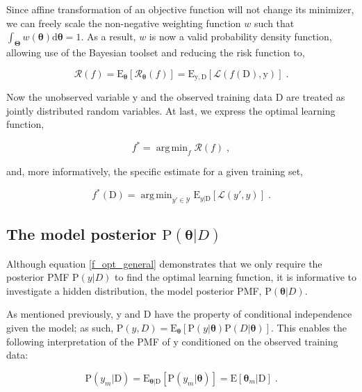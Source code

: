 \documentclass[12pt]{article}
\DeclareMathOperator*{\argmin}{arg\,min}
\begin{document}
Since affine transformation of an objective function will not change its minimizer, we can freely scale the non-negative weighting function $w$ such that $\int_{\bm{\Theta}} w(\bm{\theta}) \mathrm{d}\bm{\theta} = 1$. As a result, $w$ is now a valid probability density function, allowing use of the Bayesian toolset and reducing the risk function to,   

\begin{equation}
\mathcal{R}(f) = \text{E}_{\bm{\theta}}\left[  \mathcal{R}_{\bm{\theta}}(f) \right] = \text{E}_{\mathrm{y},\mathrm{D}}\left[ \mathcal{L}(f(\mathrm{D}),\mathrm{y}) \right] \;.
\end{equation}

Now the unobserved variable $\mathrm{y}$ and the observed training data $\mathrm{D}$ are treated as jointly distributed random variables. At last, we express the optimal learning function,

\begin{equation}
f^* = \argmin_{f} \mathcal{R}(f) \;,
\end{equation}

and, more informatively, the specific estimate for a given training set, 

\begin{equation} \label{f_opt_general}
f^*(\mathrm{D}) = \argmin_{y' \in \mathcal{Y}} \text{E}_{y|\mathrm{D}}\left[ \mathcal{L}(y',y) \right] \;.
\end{equation}




\subsection{The model posterior $\text{P}(\bm{\theta} | D)$}

Although equation \eqref{f_opt_general} demonstrates that we only require the posterior PMF $\text{P}(y | D)$ to find the optimal learning function, it is informative to investigate a hidden distribution, the model posterior PMF, $\text{P}(\bm{\theta} | D)$. 

As mentioned previously, $\mathrm{y}$ and $\mathrm{D}$ have the property of conditional independence given the model; as such, $\text{P}(y,D) = \text{E}_{\bm{\theta}} \left[ \text{P}(y | \bm{\theta}) \text{P}(D | \bm{\theta}) \right]$. This enables the following interpretation of the PMF of $\mathrm{y}$ conditioned on the observed training data:

\begin{equation}
\text{P}(y_m | \mathrm{D}) = \text{E}_{\bm{\theta} | \mathrm{D}} \left[ \text{P}(y_m|\bm{\theta}) \right] = \text{E}\left[ \bm{\theta}_m | \mathrm{D} \right] \;.
\end{equation}
\end{document}
